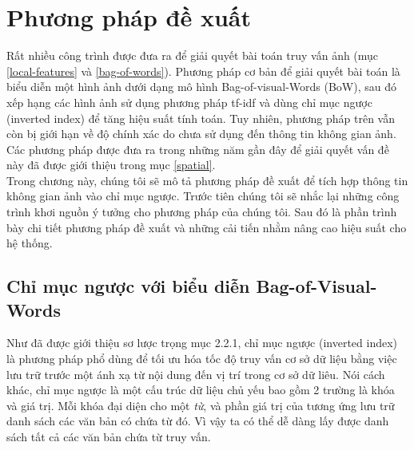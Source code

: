 \chapter{Phương pháp đề xuất}
\label{chapter:proposed}
\ifpdf
    \graphicspath{{Chapter3/Chapter3Figs/PNG/}{Chapter3/Chapter3Figs/PDF/}{Chapter3/Chapter3Figs/}}
\else
    \graphicspath{{Chapter3/Chapter3Figs/EPS/}{Chapter3/Chapter3Figs/}}
\fi


Rất nhiều công trình được đưa ra để giải quyết bài toán truy vấn ảnh (mục \ref{local-features} và \ref{bag-of-words}). Phương pháp cơ bản để giải quyết bài toán là biểu diễn một hình ảnh dưới dạng mô hình Bag-of-visual-Words (BoW), sau đó xếp hạng các hình ảnh sử dụng phương pháp tf-idf và dùng chỉ mục ngược (inverted index) để tăng hiệu suất tính toán. Tuy nhiên, phương pháp trên vẫn còn bị giới hạn về độ chính xác do chưa sử dụng đến thông tin không gian ảnh. Các phương pháp được đưa ra trong những năm gần đây để giải quyết vấn đề này đã được giới thiệu trong mục \ref{spatial}.\\

Trong chương này, chúng tôi sẽ mô tả phương pháp đề xuất để tích hợp thông tin không gian ảnh vào chỉ mục ngược. Trước tiên chúng tôi sẽ nhắc lại những công trình khơi nguồn ý tưởng cho phương pháp của chúng tôi. Sau đó là phần trình bày chi tiết phương pháp đề xuất và những cải tiến nhằm nâng cao hiệu suất cho hệ thống.

\section{Chỉ mục ngược với biểu diễn Bag-of-Visual-Words}
\label{sec:inverted-index}
Như đã được giới thiệu sơ lược trọng mục 2.2.1, chỉ mục ngược (inverted index) là phương pháp phổ dùng để tối ưu hóa tốc độ truy vấn cơ sở dữ liệu bằng việc lưu trữ trước một ánh xạ từ nội dung đến vị trí trong cơ sở dữ liêu. Nói cách khác, chỉ mục ngược là một cấu trúc dữ liệu chủ yếu bao gồm 2 trường là khóa và giá trị. Mỗi khóa đại diện cho một \textit{từ}, và phần giá trị của tương ứng lưu trữ danh sách các văn bản có chứa từ đó. Vì vậy ta có thể dễ dàng lấy được danh sách tất cả các văn bản chứa từ truy vấn.

